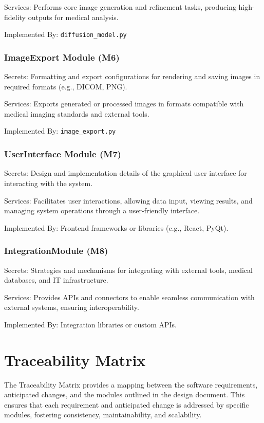 \documentclass[12pt, titlepage]{article}
\begin{document}
Services: Performs core image generation and refinement tasks, producing high-fidelity outputs for medical analysis.

Implemented By: \verb|diffusion_model.py|

\subsubsection{ImageExport Module (M6)}
Secrets: Formatting and export configurations for rendering and saving images in required formats (e.g., DICOM, PNG).

Services: Exports generated or processed images in formats compatible with medical imaging standards and external tools.

Implemented By: \verb|image_export.py|

\subsubsection{UserInterface Module (M7)}
Secrets: Design and implementation details of the graphical user interface for interacting with the system.

Services: Facilitates user interactions, allowing data input, viewing results, and managing system operations through a user-friendly interface.

Implemented By: Frontend frameworks or libraries (e.g., React, PyQt).

\subsubsection{IntegrationModule (M8)}
Secrets: Strategies and mechanisms for integrating with external tools, medical databases, and IT infrastructure.

Services: Provides APIs and connectors to enable seamless communication with external systems, ensuring interoperability.

Implemented By: Integration libraries or custom APIs.

\section{Traceability Matrix} \label{SecTM}

The Traceability Matrix provides a mapping between the software requirements, anticipated changes, and the modules outlined in the design document. This ensures that each requirement and anticipated change is addressed by specific modules, fostering consistency, maintainability, and scalability.
\end{document}

